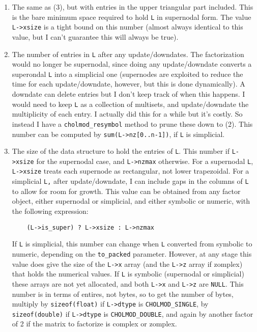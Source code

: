 \documentclass[11pt]{article}
\begin{document}
\begin{enumerate}
\item
The same as (3), but with entries in the upper triangular part included.  This
is the bare minimum space required to hold \verb'L' in supernodal form.  The
value \verb'L->xsize' is a tight bound on this number (almost always identical
to this value, but I can't guarantee this will always be true).

\item
The number of entries in \verb'L' after any update/downdates.  The
factorization would no longer be supernodal, since doing any update/downdate
converts a superondal \verb'L' into a simplicial one (supernodes are exploited
to reduce the time for each update/downdate, however, but this is done
dynamically).  A downdate can delete entries but I don't keep track of when
this happens.  I would need to keep \verb'L' as a collection of multisets, and
update/downdate the multiplicity of each entry.  I actually did this for a
while but it's costly.  So instead I have a \verb'cholmod_resymbol' method to
prune these down to (2).  This number can be computed by
\verb'sum(L->nz[0..n-1])', if \verb'L' is simplicial.

\item
The size of the data structure to hold the entries of \verb'L'.  This
number if \verb'L->xsize' for the supernodal case, and \verb'L->nzmax'
otherwise. For a supernodal \verb'L', \verb'L->xsize' treats each supernode as
rectangular, not lower trapezoidal. For a simplicial \verb'L,' after
update/downdate, I can include gaps in the columns of \verb'L' to allow for
room for growth.  This value can be obtained from any factor object,
either supernodal or simplicial,  and either symbolic or numeric, with the
following expression:

\begin{verbatim}
    (L->is_super) ? L->xsize : L->nzmax
\end{verbatim}

If \verb'L' is simplicial, this number can change when \verb'L' converted from
symbolic to numeric, depending on the \verb'to_packed' parameter.  However, at
any stage this value does give the size of the \verb'L->x' array (and the
\verb'L->z' array if zomplex) that holds the numerical values.  If \verb'L' is
symbolic (supernodal or simplicial) these arrays are not yet allocated, and
both \verb'L->x' and \verb'L->z' are \verb'NULL'.  This number is in terms of
entires, not bytes, so to get the number of bytes, multiply by
\verb'sizeof(float)' if \verb'L->dtype' is \verb'CHOLMOD_SINGLE', by
\verb'sizeof(double)' if \verb'L->dtype' is \verb'CHOLMOD_DOUBLE', and again by
another factor of 2 if the matrix to factorize is complex or zomplex.

\end{enumerate}
\end{document}
